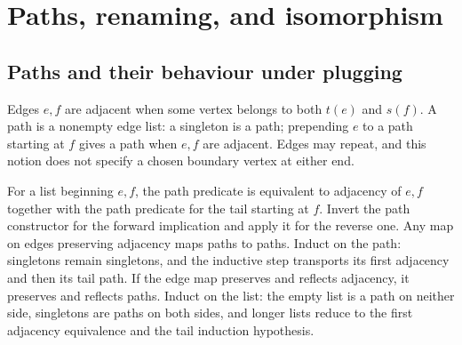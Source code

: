 \section{Paths, renaming, and isomorphism}
\subsection{Paths and their behaviour under plugging}
\begin{definition}\label{term:path}
Edges $e,f$ are adjacent when some vertex belongs to both $t(e)$ and $s(f)$.
A path is a nonempty edge list: a singleton is a path; prepending $e$ to a path
starting at $f$ gives a path when $e,f$ are adjacent. Edges may repeat, and this
notion does not specify a chosen boundary vertex at either end.
\end{definition}
For a list beginning $e,f$, the path predicate is equivalent to adjacency of
$e,f$ together with the path predicate for the tail starting at $f$. Invert the
path constructor for the forward implication and apply it for the reverse one.
Any map on edges preserving adjacency maps paths to paths. Induct on the path:
singletons remain singletons, and the inductive step transports its first
adjacency and then its tail path. If the edge map preserves and reflects
adjacency, it preserves and reflects paths. Induct on the list: the empty list
is a path on neither side, singletons are paths on both sides, and longer lists
reduce to the first adjacency equivalence and the tail induction hypothesis.

